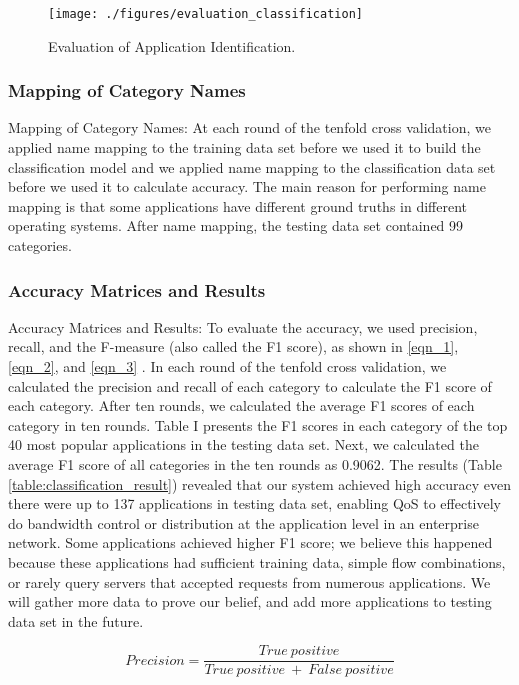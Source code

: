 \documentclass[journal]{IEEEtran}
\begin{document}
\begin{figure}[!t]
\centering
\texttt{[image: ./figures/evaluation\_classification]}
\caption{Evaluation of Application Identification.}
\label{fig:evaluation_classification}
\end{figure}

\subsubsection{Mapping of Category Names}
Mapping of Category Names: At each round of the tenfold cross validation, we applied name mapping to the training data set before we used it to build the classification model and we applied name mapping to the classification data set before we used it to calculate accuracy. The main reason for performing name mapping is that some applications have different ground truths in different operating systems. After name mapping, the testing data set contained 99 categories.

\subsubsection{Accuracy Matrices and Results}
Accuracy Matrices and Results: To evaluate the accuracy, we used precision, recall, and the F-measure (also called the F1 score), as shown in \ref{eqn_1}, \ref{eqn_2}, and \ref{eqn_3} \cite{muc4}. In each round of the tenfold cross validation, we calculated the precision and recall of each category to calculate the F1 score of each category. After ten rounds, we calculated the average F1 scores of each category in ten rounds. Table I presents the F1 scores in each category of the top 40 most popular applications in the testing data set. Next, we calculated the average F1 score of all categories in the ten rounds as 0.9062. The results (Table \ref{table:classification_result}) revealed that our system achieved high accuracy even there were up to 137 applications in testing data set, enabling QoS to effectively do bandwidth control or distribution at the application level in an enterprise network. Some applications achieved higher F1 score; we believe this happened because these applications had sufficient training data, simple flow combinations, or rarely query servers that accepted requests from numerous applications. We will gather more data to prove our belief, and add more applications to testing data set in the future.

\begin{equation}
\label{eqn_1}
Precision = \dfrac{True\ positive}{True\ positive\ +\ False\ positive}
\end{equation}
\end{document}

